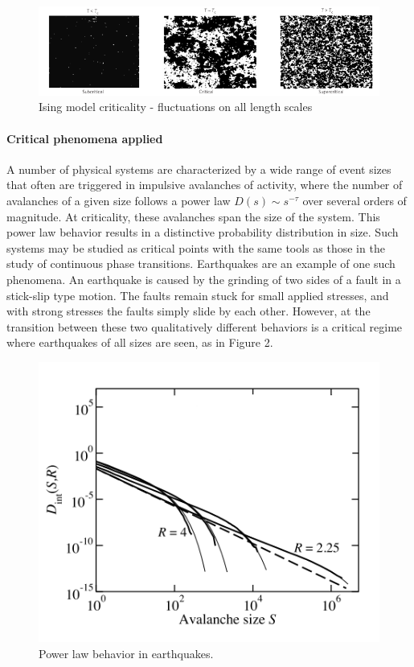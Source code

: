 \documentclass[12pt]{article}
\begin{document}
\begin{figure}      
  \begin{center}    
 \includegraphics[width=1\textwidth]{Isingchialvo}    
    \caption{Ising model criticality - fluctuations on all length scales \cite{Chialvo2010a}}   
   \label{Figure::Ising model criticality}   
  \end{center}     
   \end{figure}
   


\paragraph*{Critical phenomena applied}

A number of physical systems are characterized by a wide range of event sizes that often are triggered in impulsive avalanches of activity, where the number of avalanches of a given size follows a power law $ D(s) \sim s^{-\tau} $ over several orders of magnitude. At criticality, these avalanches span the size of the system. This power law behavior results in a distinctive probability distribution in size. Such systems may be studied as critical points with the same tools as those in the study of continuous phase transitions. Earthquakes are an example of one such phenomena\cite{Sethna2011a}. An earthquake is caused by the grinding of two sides of a fault in a stick-slip type motion. The faults remain stuck for small applied stresses, and with strong stresses the faults simply slide by each other. However, at the transition between these two qualitatively different behaviors is a critical regime where earthquakes of all sizes are seen, as in Figure 2.

\begin{figure}      
  \begin{center}    
 \includegraphics[width=.60\textwidth]{earthquakesandavalanchessethna}    
    \caption{Power law behavior in earthquakes. \cite{Sethna2011a}}   
   \label{Figure::Power law behavior in earthquakes}   
  \end{center}     
   \end{figure}
\end{document}
